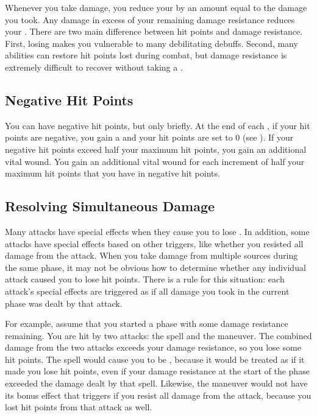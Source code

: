     Whenever you take damage, you reduce your  by an amount equal to the damage you took.
    Any damage in excess of your remaining damage resistance reduces your .
    There are two main difference between hit points and damage resistance.
    First, losing  makes you vulnerable to many debilitating debuffs.
    Second, many abilities can restore hit points lost during combat, but damage resistance is extremely difficult to recover without taking a .

    \subsection{Negative Hit Points}
        You can have negative hit points, but only briefly.
        At the end of each , if your hit points are negative, you gain a  and your hit points are set to 0 (see ).
        If your negative hit points exceed half your maximum hit points, you gain an additional vital wound.
        You gain an additional vital wound for each increment of half your maximum hit points that you have in negative hit points.

    \subsection{Resolving Simultaneous Damage}\label{Resolving Simultaneous Damage}
        Many attacks have special effects when they cause you to lose .
        In addition, some attacks have special effects based on other triggers, like whether you resisted all damage from the attack.
        When you take damage from multiple sources during the same phase, it may not be obvious how to determine whether any individual attack caused you to lose hit points.
        There is a rule for this situation: each attack's special effects are triggered as if all damage you took in the current phase was dealt by that attack.

        For example, assume that you started a phase with some damage resistance remaining.
        You are hit by two attacks: the  spell and the  maneuver.
        The combined damage from the two attacks exceeds your damage resistance, so you lose some hit points.
        The  spell would cause you to be \stunned, because it would be treated as if it made you lose hit points, even if your damage resistance at the start of the phase exceeded the damage dealt by that spell.
        Likewise, the  maneuver would not have its bonus effect that triggers if you resist all damage from the attack, because you lost hit points from that attack as well.

